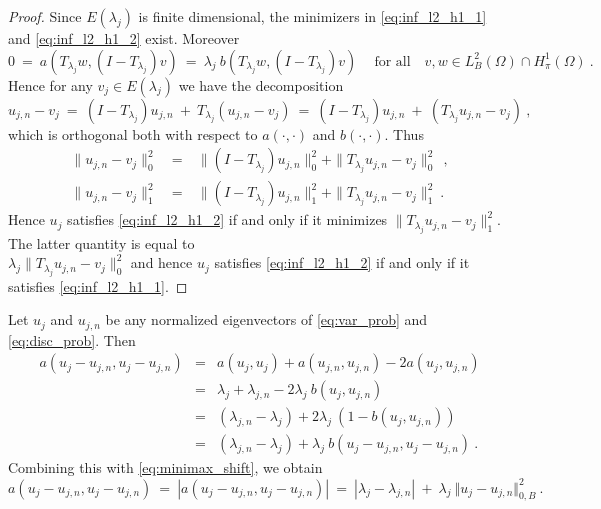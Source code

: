 \documentclass[preprint ,12pt]{elsarticle}
\newcommand{\cB}{{B}}
\begin{document}
\begin{proof}
{Since $E(\lambda_j)$ is
finite dimensional,   
the minimizers in \eqref{eq:inf_l2_h1_1} and \eqref{eq:inf_l2_h1_2}
exist. Moreover 
\begin{equation}\label{eq:l2_ortho_1}
0  \ = \ a(T_{\lambda_j} w, (I-T_{\lambda_j}) v) \ =\
\lambda_j\ b(T_{\lambda_j} w, (I-T_{\lambda_j}) v) \   \quad \text{for all} \quad 
v,w\in L^2_\cB(\Omega)\cap H_{\pi}^1(\Omega)\ .
\end{equation}
Hence for any $v_j \in E(\lambda_j)$ we have the decomposition   
$$u_{j,n}-v_j\ = \ (I-T_{\lambda_j})u_{j,n}\ +\ T_{\lambda_j} (u_{j,n}-v_j)
\ = \  (I-T_{\lambda_j})u_{j,n}\ +\ (T_{\lambda_j} u_{j,n}-v_j) \ ,
$$
which is orthogonal both with respect to $a(\cdot, \cdot)$
and $b(\cdot, \cdot)$. Thus 
\begin{eqnarray*}
\|u_{j,n}-v_j\|_{0}^2\ & = & \ 
\|(I-T_{\lambda_j})u_{j,n}\|_{0}^2 +
\|T_{\lambda_j} u_{j,n}-v_j\|_{0}^2 \ \ ,\\
\|u_{j,n}-v_j\|_{1}^2\ & = & \ 
\|(I-T_{\lambda_j})u_{j,n}\|_{1}^2 +
\|T_{\lambda_j} u_{j,n}-v_j\|_{1}^2 \ .
\end{eqnarray*}
Hence $u_j$  satisfies \eqref{eq:inf_l2_h1_2}  if and only if it minimizes 
$\|T_{\lambda_j}u_{j,n}-v_j\|_{1}^2$.  The latter quantity is
equal to \\$\lambda_j \|T_{\lambda_j}u_{j,n}-v_j\|_{0}^2$
and hence $u_j$ satisfies  \eqref{eq:inf_l2_h1_2} if and only
if it satisfies \eqref{eq:inf_l2_h1_1}.}

\end{proof}

Let $u_j$ and $u_{j,n}$ be any
normalized eigenvectors of \eqref{eq:var_prob}
and \eqref{eq:disc_prob}.
Then
\begin{eqnarray}
\label{eq:basic1} a(u_j - u_{j,n}, u_j - u_{j,n}) &=& a(u_j,u_j) +
a(u_{j,n},u_{j,n})
- 2 a(u_{j},u_{j,n})\nonumber\\
&=&    \lambda_j +  \lambda_{j,n} -  2\lambda_j \ b(u_{j},u_{j,n})
\nonumber\\
&=&      (\lambda_{j,n} - \lambda_j)  +2  \lambda_j\ (1-b(u_{j},u_{j,n}))\nonumber\\
&=&
(\lambda_{j,n} - \lambda_j)  +\lambda_j\
b(u_{j}-u_{j,n},u_{j}-u_{j,n} ) \ .
\end{eqnarray}
Combining this with \eqref{eq:minimax_shift}, we obtain
\begin{equation}
a(u_j-u_{j,n},u_j-u_{j,n}) \ =\ |a(u_j-u_{j,n},u_j-u_{j,n})|\ =\  |\lambda_j-\lambda_{j,n}| \ + \
\lambda_j \ \Vert u_{j}-u_{j,n}\Vert_{0,\cB}^2\ .
\label{eq:basic2}
\end{equation}
\end{document}
